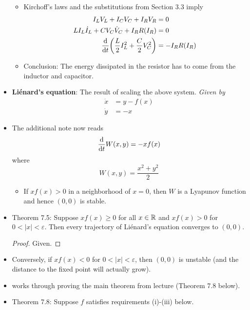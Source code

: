 \documentclass[../notes.tex]{subfiles}
\begin{document}
\begin{itemize}
    \begin{itemize}
        \item Kirchoff's laws and the substitutions from Section 3.3 imply
        \begin{align*}
            I_LV_L+I_CV_C+I_RV_R &= 0\\
            LI_L\dot{I}_L+CV_C\dot{V}_C+I_RR(I_R) &= 0\\
            \dv{t}(\frac{L}{2}I_L^2+\frac{C}{2}V_C^2) &= -I_RR(I_R)
        \end{align*}
        \item Conclusion: The energy dissipated in the resistor has to come from the inductor and capacitor.
    \end{itemize}
    \item \textbf{Li\'{e}nard's equation}: The result of scaling the above system. \emph{Given by}
    \begin{align*}
        \dot{x} &= y-f(x)\\
        \dot{y} &= -x
    \end{align*}
    \item The additional note now reads
    \begin{equation*}
        \dv{t}W(x,y) = -xf(x)
    \end{equation*}
    where
    \begin{equation*}
        W(x,y) = \frac{x^2+y^2}{2}
    \end{equation*}
    \begin{itemize}
        \item If $xf(x)>0$ in a neighborhood of $x=0$, then $W$ is a Lyapunov function and hence $(0,0)$ is stable.
    \end{itemize}
    \item Theorem 7.5: Suppose $xf(x)\geq 0$ for all $x\in\mathbb{R}$ and $xf(x)>0$ for $0<|x|<\varepsilon$. Then every trajectory of Li\'{e}nard's equation converges to $(0,0)$.
    \begin{proof}
        Given.
    \end{proof}
    \item Conversely, if $xf(x)<0$ for $0<|x|<\varepsilon$, then $(0,0)$ is unstable (and the distance to the fixed point will actually grow).
    \item \textcite{bib:Teschl} works through proving the main theorem from lecture (Theorem 7.8 below).
    \item Theorem 7.8: Suppose $f$ satisfies requirements (i)-(iii) below.
    \begin{enumerate}[label={(\roman*)}]

\end{enumerate}
\end{itemize}
\end{document}
